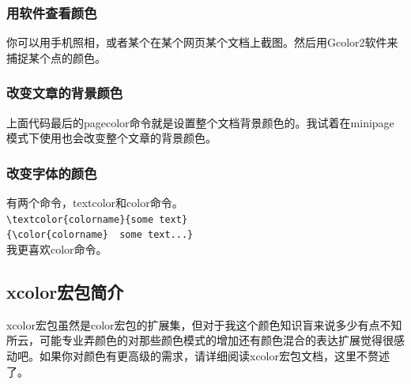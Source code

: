 \documentclass[12pt,oneside]{book}
\begin{document}
\begin{common-format}
\subsubsection{用软件查看颜色}
你可以用手机照相，或者某个在某个网页某个文档上截图。然后用Gcolor2软件来捕捉某个点的颜色。

\subsubsection{改变文章的背景颜色}
上面代码最后的pagecolor命令就是设置整个文档背景颜色的。我试着在minipage模式下使用也会改变整个文章的背景颜色。


\subsubsection{改变字体的颜色}
有两个命令，textcolor和color命令。\\
\verb+\textcolor{colorname}{some text}+\\
\verb+{\color{colorname}  some text...}+\\
我更喜欢color命令。


\subsection{xcolor宏包简介}   
xcolor宏包虽然是color宏包的扩展集，但对于我这个颜色知识盲来说多少有点不知所云，可能专业弄颜色的对那些颜色模式的增加还有颜色混合的表达扩展觉得很感动吧。如果你对颜色有更高级的需求，请详细阅读xcolor宏包文档，这里不赘述了。


\end{common-format}
\end{document}
